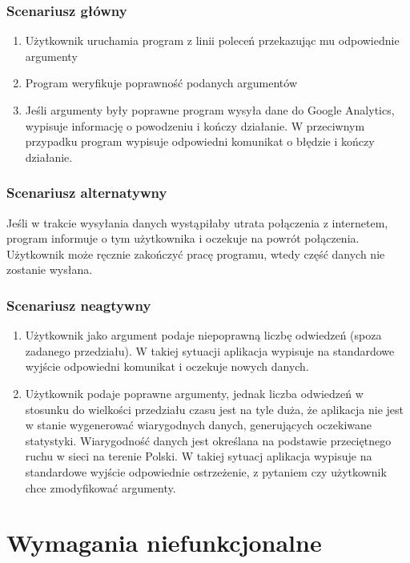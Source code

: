 \documentclass{article}
\begin{document}
\subsubsection{Scenariusz główny}
\begin{enumerate}
\item Użytkownik uruchamia program z linii poleceń przekazując mu odpowiednie argumenty
\item Program weryfikuje poprawność podanych argumentów
\item Jeśli argumenty były poprawne program wysyła dane do Google Analytics, wypisuje informację o powodzeniu i kończy działanie. W przeciwnym przypadku program wypisuje odpowiedni komunikat o błędzie i kończy działanie.
\end{enumerate}

\subsubsection{Scenariusz alternatywny}
Jeśli w trakcie wysyłania danych wystąpiłaby utrata połączenia z internetem, program informuje o tym użytkownika i oczekuje na powrót połączenia. Użytkownik może ręcznie zakończyć pracę programu, wtedy część danych nie zostanie wysłana.

\subsubsection{Scenariusz neagtywny}
\begin{enumerate}
\item Użytkownik jako argument podaje niepoprawną liczbę odwiedzeń (spoza zadanego przedziału). W takiej sytuacji aplikacja wypisuje na standardowe wyjście odpowiedni komunikat i oczekuje nowych danych.

\item Użytkownik podaje poprawne argumenty, jednak liczba odwiedzeń w stosunku do wielkości przedziału czasu jest na tyle duża, że aplikacja nie jest w stanie wygenerować wiarygodnych danych, generujących oczekiwane statystyki. Wiarygodność danych jest określana na podstawie przeciętnego ruchu w sieci na terenie Polski. W takiej sytuacj aplikacja wypisuje na standardowe wyjście odpowiednie ostrzeżenie, z pytaniem czy użytkownik chce zmodyfikować argumenty.
\end{enumerate}

\section{Wymagania niefunkcjonalne}
\end{document}
